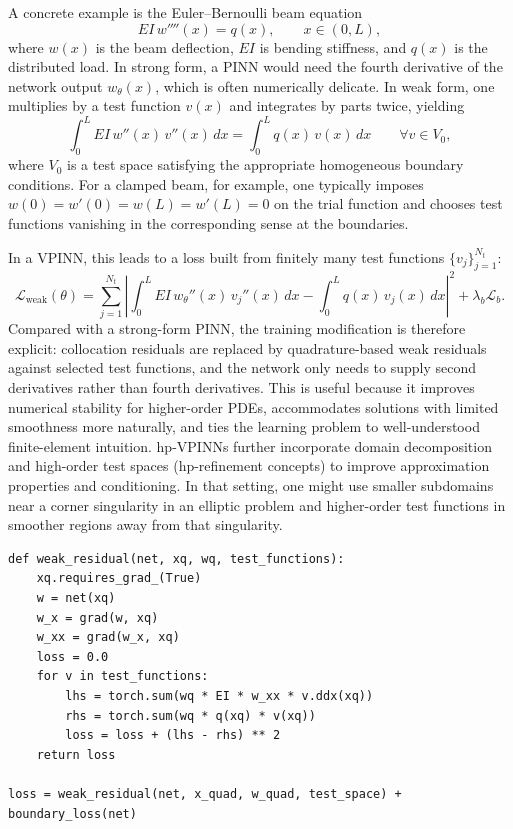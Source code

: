 \documentclass[11pt]{article}
\begin{document}
    A concrete example is the Euler--Bernoulli beam equation
    \begin{equation}
    EI\, w''''(x) = q(x), \qquad x\in(0,L),
    \end{equation}
    where $w(x)$ is the beam deflection, $EI$ is bending stiffness, and $q(x)$ is the distributed load. In strong form, a PINN would need the fourth derivative of the network output $w_\theta(x)$, which is often numerically delicate. In weak form, one multiplies by a test function $v(x)$ and integrates by parts twice, yielding
    \begin{equation}
    \int_0^L EI\, w''(x)\, v''(x)\, dx = \int_0^L q(x)\, v(x)\, dx
    \qquad \forall v \in V_0,
    \end{equation}
    where $V_0$ is a test space satisfying the appropriate homogeneous boundary conditions. For a clamped beam, for example, one typically imposes $w(0)=w'(0)=w(L)=w'(L)=0$ on the trial function and chooses test functions vanishing in the corresponding sense at the boundaries.

    In a VPINN, this leads to a loss built from finitely many test functions $\{v_j\}_{j=1}^{N_t}$:
    \begin{equation}
    \mathcal{L}_{\text{weak}}(\theta)=
    \sum_{j=1}^{N_t}
    \left|
    \int_0^L EI\, w_\theta''(x)\, v_j''(x)\, dx
    -
    \int_0^L q(x)\, v_j(x)\, dx
    \right|^2
    + \lambda_b \mathcal{L}_{b}.
    \end{equation}
    Compared with a strong-form PINN, the training modification is therefore explicit: collocation residuals are replaced by quadrature-based weak residuals against selected test functions, and the network only needs to supply second derivatives rather than fourth derivatives. This is useful because it improves numerical stability for higher-order PDEs, accommodates solutions with limited smoothness more naturally, and ties the learning problem to well-understood finite-element intuition. hp-VPINNs further incorporate domain decomposition and high-order test spaces (hp-refinement concepts) to improve approximation properties and conditioning. In that setting, one might use smaller subdomains near a corner singularity in an elliptic problem and higher-order test functions in smoother regions away from that singularity.

\begin{lstlisting}[style=scimlpython,caption={Schematic VPINN weak-residual assembly for a beam problem.},label={lst:vpinn}]
def weak_residual(net, xq, wq, test_functions):
    xq.requires_grad_(True)
    w = net(xq)
    w_x = grad(w, xq)
    w_xx = grad(w_x, xq)
    loss = 0.0
    for v in test_functions:
        lhs = torch.sum(wq * EI * w_xx * v.ddx(xq))
        rhs = torch.sum(wq * q(xq) * v(xq))
        loss = loss + (lhs - rhs) ** 2
    return loss

loss = weak_residual(net, x_quad, w_quad, test_space) + boundary_loss(net)
\end{lstlisting}
\end{document}
